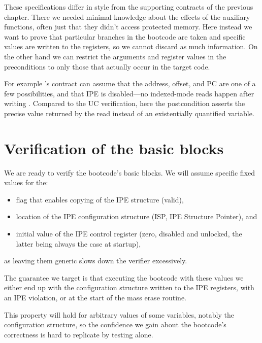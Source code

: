 These specifications differ in style from the supporting contracts of the previous chapter. There we needed minimal knowledge about the effects of the auxiliary functions, often just that they didn't access protected memory. Here instead we want to prove that particular branches in the bootcode are taken and specific values are written to the registers, so we cannot discard as much information. On the other hand we can restrict the arguments and register values in the preconditions to only those that actually occur in the target code.

For example 's contract can assume that the address, offset, and PC are one of a few possibilities, and that IPE is disabled---no indexed-mode reads happen after writing . Compared to the UC verification, here the postcondition asserts the precise value returned by the read instead of an existentially quantified variable.

\section{Verification of the basic blocks}

We are ready to verify the bootcode's basic blocks. We will assume specific fixed values for the:
\begin{itemize}
\item flag that enables copying of the IPE structure (valid),
\item location of the IPE configuration structure (ISP, IPE Structure Pointer), and
\item initial value of the IPE control register  (zero, \ie disabled and unlocked, the latter being always the case at startup),
\end{itemize}
as leaving them generic slows down the verifier excessively.

The guarantee we target is that executing the bootcode with these values we either end up with the configuration structure written to the IPE registers, with an IPE violation, or at the start of the mass erase routine.

This property will hold for arbitrary values of some variables, notably the configuration structure, so the confidence we gain about the bootcode's correctness is hard to replicate by testing alone.



